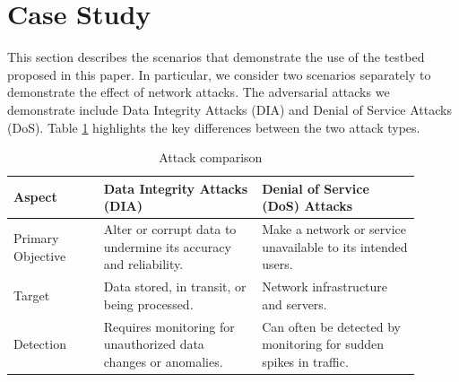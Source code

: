 \section{Case Study}
\label{sec:casestudy}
This section describes the scenarios that demonstrate the use of the testbed proposed in this paper. In particular, we consider two scenarios separately to demonstrate the effect of network attacks. The adversarial attacks we demonstrate include Data Integrity Attacks (DIA) and Denial of Service Attacks (DoS). Table \ref{tab:attacks_comparison} highlights the key differences between the two attack types.
\begin{table}[!ht]
\centering
\caption{Attack comparison}
\label{tab:attacks_comparison}
\begin{tabular}{@{}>{\raggedright}p{0.2\linewidth}>{\raggedright\arraybackslash}p{0.35\linewidth}>{\raggedright\arraybackslash}p{0.35\linewidth}@{}}
\toprule
\textbf{Aspect} & \textbf{Data Integrity Attacks (DIA)} & \textbf{Denial of Service (DoS) Attacks} \\
\midrule
Primary Objective & Alter or corrupt data to undermine its accuracy and reliability. &  Make a network or service unavailable to its intended users. \\
\addlinespace
Target & Data stored, in transit, or being processed. & Network infrastructure and servers. \\
\addlinespace
Detection & Requires monitoring for unauthorized data changes or anomalies. & Can often be detected by monitoring for sudden spikes in traffic. \\
\bottomrule
\end{tabular}
\end{table}

